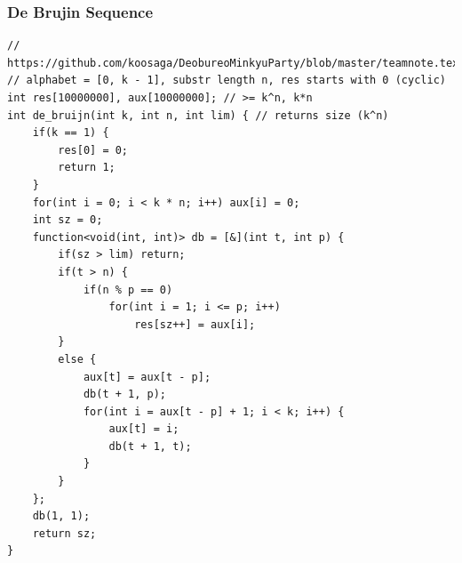 \documentclass[landscape, 8pt, a4paper, oneside, twocolumn]{extarticle}
\begin{document}
\subsubsection{De Brujin Sequence}
\begin{verbatim}
// https://github.com/koosaga/DeobureoMinkyuParty/blob/master/teamnote.tex
// alphabet = [0, k - 1], substr length n, res starts with 0 (cyclic)
int res[10000000], aux[10000000]; // >= k^n, k*n 
int de_bruijn(int k, int n, int lim) { // returns size (k^n)
    if(k == 1) {
        res[0] = 0;
        return 1;
    }
    for(int i = 0; i < k * n; i++) aux[i] = 0;
    int sz = 0;
    function<void(int, int)> db = [&](int t, int p) {
        if(sz > lim) return;
        if(t > n) {
            if(n % p == 0)
                for(int i = 1; i <= p; i++)
                    res[sz++] = aux[i];
        }
        else {
            aux[t] = aux[t - p];
            db(t + 1, p);
            for(int i = aux[t - p] + 1; i < k; i++) {
                aux[t] = i;
                db(t + 1, t);
            }
        }
    };
    db(1, 1);
    return sz;
}
\end{verbatim}
\end{document}
